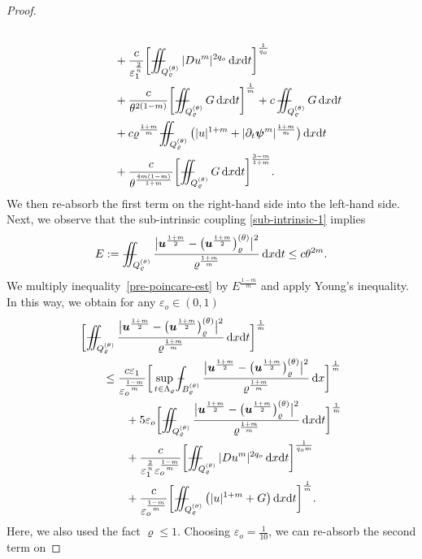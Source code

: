 \documentclass[a4paper, 10pt, american]{amsart}
\numberwithin{theorem}{section}
\numberwithin{equation}{section}
\newcommand{\dxdt}{\,\mathrm{d}x\mathrm{d}t}
\newcommand{\dx}{\,\mathrm{d}x}
\renewcommand{\epsilon}{\varepsilon}
\renewcommand{\epsilon}{\varepsilon}
\renewcommand{\rho}{\varrho}
\newcommand{\power}[2]{\bm{#1^{\mbox{\unboldmath{\scriptsize$#2$}}}}}
\def\Xint#1{\mathchoice
    {\XXint\displaystyle\textstyle{#1}}%
    {\XXint\textstyle\scriptstyle{#1}}%
    {\XXint\scriptstyle\scriptscriptstyle{#1}}%
    {\XXint\scriptscriptstyle\scriptscriptstyle{#1}}%
    \!\int}
\def\XXint#1#2#3{\setbox0=\hbox{$#1{#2#3}{\int}$}
    \vcenter{\hbox{$#2#3$}}\kern-0.5\wd0}
\def\bint{\Xint-}
\def\Xiint#1{\mathchoice
    {\XXiint\displaystyle\textstyle{#1}}%
    {\XXiint\textstyle\scriptstyle{#1}}%
    {\XXiint\scriptstyle\scriptscriptstyle{#1}}%
    {\XXiint\scriptscriptstyle\scriptscriptstyle{#1}}%
    \!\iint}
\def\XXiint#1#2#3{\setbox0=\hbox{$#1{#2#3}{\iint}$}
    \vcenter{\hbox{$#2#3$}}\kern-0.5\wd0}
\def\biint{\Xiint{-\!-}}
\begin{document}
\begin{proof}
\begin{align}
 \\\nonumber
&\qquad\qquad+
\frac{c}{\epsilon_1^{\frac2n}}\bigg[ \biint_{Q_\rho^{(\theta)}}
|Du^m|^{2q_o}\dxdt\bigg]^{\frac1{q_o}}\\\nonumber
&\qquad\qquad+
\frac c{\theta^{2(1-m)}}\bigg[ \biint_{Q_\rho^{(\theta)}} G \dxdt\bigg]^{\frac1m}
+
c\,\biint_{Q_\rho^{(\theta)}}G\dxdt
\\\nonumber
&\qquad\qquad+
c\rho^{\frac{1+m}m}
\biint_{Q_\rho^{(\theta)}}\big(|u|^{1+m}+ |\partial_t \power \psi m|^{\frac{1+m}{m}}\big) \dxdt \\
&\qquad\qquad+
  \frac{c}{\theta^{\frac{4m(1-m)}{1+m}}}\bigg[
\biint_{Q_\rho^{(\theta)}}G
\dxdt\bigg]^{\frac{3-m}{1+m}}.
\end{align}
We then re-absorb the first term on the right-hand side into the left-hand side.
Next, we observe that the sub-intrinsic coupling
\eqref{sub-intrinsic-1} implies 
\begin{align*}
E:=\biint_{Q_{\rho}^{(\theta)}}\frac{\big|\power u{\frac{1+m}2} - \big( \power u{\frac{1+m}2}\big)_{\rho}^{(\theta)}\big|^2}{\rho^{\frac{1+m}m}} \dxdt
\le
c\theta^{2m}.
\end{align*}
We multiply inequality~\eqref{pre-poincare-est} by $E^{\frac{1-m}m}$
and apply Young's inequality. 
In this way, we obtain for any $\epsilon_o\in(0,1)$
\begin{align}
\nonumber
&\bigg[ \biint_{Q_{\rho}^{(\theta)}}\frac{\big|\power u{\frac{1+m}2} - \big( \power u{\frac{1+m}2}\big)_{\rho}^{(\theta)}\big|^2}{\rho^{\frac{1+m}m}} \dxdt \bigg]^{\frac1m} \\\nonumber
&\qquad\le
\frac{c\epsilon_1}{\epsilon_o^{\frac{1-m}m}}\bigg[ \sup_{t\in\Lambda_\rho}\bint_{B_{\rho}^{(\theta)}}\frac{\big|\power u{\frac{1+m}2} - \big( \power u{\frac{1+m}2}\big)_{\rho}^{(\theta)}\big|^2}{\rho^{\frac{1+m}m}} \dx\bigg]^{\frac1m}\\\nonumber
&\qquad\qquad+
5
\epsilon_o\bigg[  \biint_{Q_{\rho}^{(\theta)}}\frac{\big|\power u{\frac{1+m}2} - \big( \power u{\frac{1+m}2}\big)_{\rho}^{(\theta)}\big|^2}{\rho^{\frac{1+m}m}} \dxdt \bigg]^{\frac1m}\\\nonumber
&\qquad\qquad+
\frac{c}{\epsilon_1^{\frac2n}\epsilon_o^{\frac{1-m}m}}\bigg[ \biint_{Q_\rho^{(\theta)}} |Du^m|^{2q_o}\dxdt\bigg]^{\frac1{q_om}}\\
&\qquad\qquad+
\frac{c}{\epsilon_o^{\frac{1-m}m}}\bigg[ \biint_{Q_\rho^{(\theta)}}\big(|u|^{1+m}+ G\big) \dxdt\bigg]^{\frac1m}.
\end{align}
Here, we also used the fact $\rho\le1$.
Choosing $\epsilon_o=\frac1{10}$, we can re-absorb the second term on

\end{proof}
\end{document}
